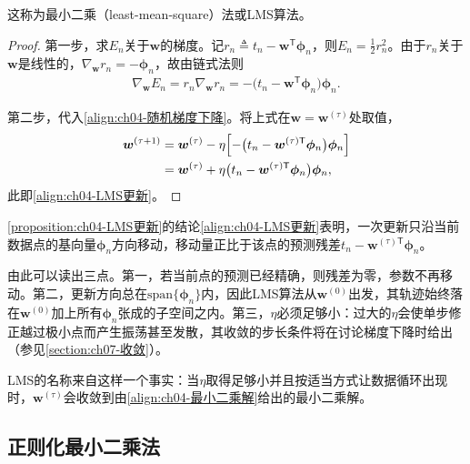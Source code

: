\documentclass[../../main.tex]{subfiles}
\begin{document}
这称为最小二乘（least-mean-square）法或LMS算法。

\begin{proof}
第一步，求$E_n$关于$\boldsymbol{w}$的梯度。记$r_n\triangleq t_n-\boldsymbol{w}^{\mathsf{T}}\boldsymbol{\phi}_n$，则$E_n=\frac{1}{2}r_n^2$。由于$r_n$关于$\boldsymbol{w}$是线性的，$\nabla_{\boldsymbol{w}}r_n=-\boldsymbol{\phi}_n$，故由链式法则
\begin{align*}
  \nabla_{\boldsymbol{w}}E_n=r_n\nabla_{\boldsymbol{w}}r_n=-\bigl(t_n-\boldsymbol{w}^{\mathsf{T}}\boldsymbol{\phi}_n\bigr)\boldsymbol{\phi}_n .
\end{align*}

第二步，代入\eqref{align:ch04-随机梯度下降}。将上式在$\boldsymbol{w}=\boldsymbol{w}^{(\tau)}$处取值，
\begin{align*}
  \boldsymbol{w}^{(\tau+1)}&=\boldsymbol{w}^{(\tau)}-\eta\Bigl[-\bigl(t_n-\boldsymbol{w}^{(\tau)\mathsf{T}}\boldsymbol{\phi}_n\bigr)\boldsymbol{\phi}_n\Bigr]\\
  &=\boldsymbol{w}^{(\tau)}+\eta\bigl(t_n-\boldsymbol{w}^{(\tau)\mathsf{T}}\boldsymbol{\phi}_n\bigr)\boldsymbol{\phi}_n,
\end{align*}
此即\eqref{align:ch04-LMS更新}。
\end{proof}

\begin{remark}
\cref{proposition:ch04-LMS更新}的结论\eqref{align:ch04-LMS更新}表明，一次更新只沿当前数据点的基向量$\boldsymbol{\phi}_n$方向移动，移动量正比于该点的预测残差$t_n-\boldsymbol{w}^{(\tau)\mathsf{T}}\boldsymbol{\phi}_n$。

由此可以读出三点。第一，若当前点的预测已经精确，则残差为零，参数不再移动。第二，更新方向总在$\mathrm{span}\{\boldsymbol{\phi}_n\}$内，因此LMS算法从$\boldsymbol{w}^{(0)}$出发，其轨迹始终落在$\boldsymbol{w}^{(0)}$加上所有$\boldsymbol{\phi}_n$张成的子空间之内。第三，$\eta$必须足够小：过大的$\eta$会使单步修正越过极小点而产生振荡甚至发散，其收敛的步长条件将在讨论梯度下降时给出（参见\cref{section:ch07-收敛}）。

LMS的名称来自这样一个事实：当$\eta$取得足够小并且按适当方式让数据循环出现时，$\boldsymbol{w}^{(\tau)}$会收敛到由\eqref{align:ch04-最小二乘解}给出的最小二乘解。
\end{remark}

\subsection{正则化最小二乘法}\label{subsection:ch04-正则化最小二乘}
\end{document}
